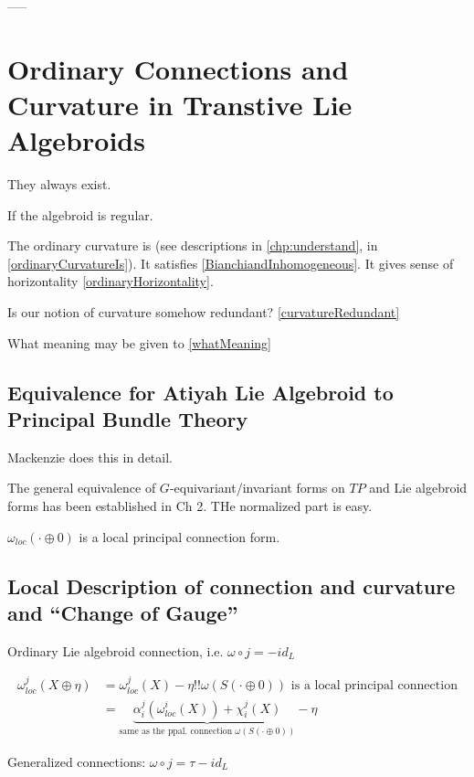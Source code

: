 {\begin{itemize}
    \end{itemize}

-----



\section{Ordinary Connections and Curvature in Transtive Lie Algebroids}

They always exist.

If the algebroid is regular.

The ordinary curvature is (see descriptions in \ref{chp:understand}, in \ref{ordinaryCurvatureIs}). It satisfies \ref{BianchiandInhomogeneous}. It gives sense of horizontality \ref{ordinaryHorizontality}.

Is our notion of curvature somehow redundant? \ref{curvatureRedundant}

What meaning may be given to \ref{whatMeaning}


\subsection{Equivalence for Atiyah Lie Algebroid to Principal Bundle Theory}

Mackenzie does this in detail.

The general equivalence of $G$-equivariant/invariant forms on $TP$ and Lie algebroid forms has been established in Ch 2. THe normalized part is easy.

$\omega_{loc}(\cdot \oplus 0)$ is a local principal connection form.

\subsection{Local Description of connection and curvature and ``Change of Gauge''}

Ordinary Lie algebroid connection, i.e. $\omega \circ j = - id_L$

\begin{align}
    \omega^j_{loc}(X \oplus \eta) 
    &= \omega^j_{loc}(X) - \eta !!\text{$\omega(S(\cdot \oplus 0))$ is a local principal connection}\\
    &= \underbrace{\alpha^j_i(\omega^i_{loc}(X)) + \chi^j_i(X)}_{\text{same as the ppal. connection $\omega(S(\cdot \oplus 0))$}}- \eta
\end{align}

Generalized connections: $\omega \circ j = \tau - id_L$

}
